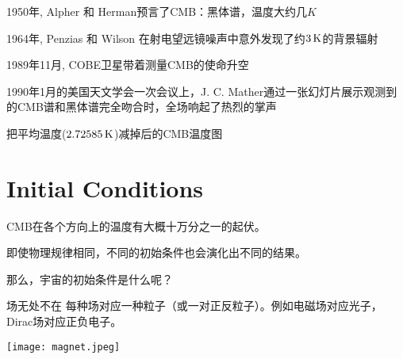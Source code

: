 \documentclass[CJK]{beamer}
\begin{document}
\begin{frame}
  \bch
  \ech
\end{frame}


\begin{frame}
  \bch
  \bitem
\item{1950年, Alpher 和 Herman预言了CMB：黑体谱，温度大约几$K$}
\item{1964年, Penzias 和 Wilson 在射电望远镜噪声中意外发现了约$3\,\mathrm{K}$的背景辐射}
\item{1989年11月, COBE卫星带着测量CMB的使命升空}
\item{   \emini
  1990年1月的美国天文学会一次会议上，J. C. Mather通过一张幻灯片展示观测到的CMB谱和黑体谱完全吻合时，全场响起了热烈的掌声\emini
}  
  \eitem

  \ech
\end{frame}

\begin{frame}
  \bch
  \ech
\end{frame}


\begin{frame}
  \bch
  \bcenter
  
  把平均温度($2.72585\,\mathrm{K}$)减掉后的CMB温度图
  \ecenter
  \ech
\end{frame}

\section{Initial Conditions}
\begin{frame}
  \bch
  CMB在各个方向上的温度有大概十万分之一的起伏。
  \ech
\end{frame}


\begin{frame}
  \bch
  即使物理规律相同，不同的初始条件也会演化出不同的结果。

  \skiplines

  那么，宇宙的初始条件是什么呢？
  \ech
\end{frame}


\begin{frame}
\bch
\begin{minipage}{0.5\textwidth}
场无处不在
\skipline
每种场对应一种粒子（或一对正反粒子）。例如电磁场对应光子，Dirac场对应正负电子。
\end{minipage}
\begin{minipage}{0.4\textwidth}
\texttt{[image: magnet.jpeg]}
\end{minipage}
\ech
\end{frame}
\end{document}
